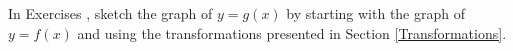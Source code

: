 {\noindent In Exercises}
{, sketch the graph of $y=g(x)$ by starting with the graph of $y = f(x)$ and using the transformations presented in Section \ref{Transformations}. 
}
